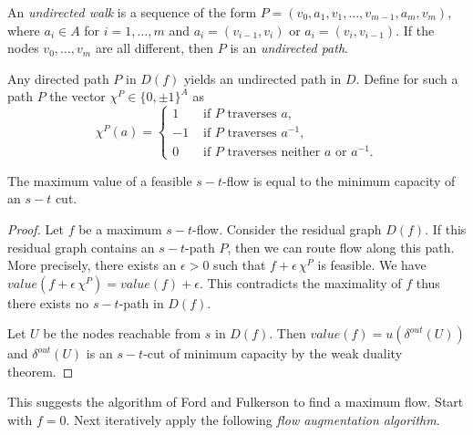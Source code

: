 \begin{definition}
\label{f:def:7}
  An \emph{undirected walk} is a  sequence of the form
  $P=(v_0,a_1,v_1,\ldots,v_{m-1},a_m,v_m)$, where  $a_i \in A$ for
  $i=1,\ldots,m$ and $a_i = (v_{i-1},v_i)$ or $a_i = (v_{i},v_{i-1})$. If
  the nodes $v_0,\ldots,v_m$ are all 
  different, then $P$ is an \emph{undirected path}. 
\end{definition}


Any directed path $P$ in $D(f)$ yields an undirected path  in
$D$. Define for such a path $P$ the vector $\chi^P \in \{0,\pm1\}^A$ as
\begin{equation}
  \label{f:eq:29}
  \chi^P(a) = 
  \begin{cases}
    1 & \mbox{ if $P$ traverses $a$},\\
    -1&  \mbox{ if $P$ traverses $a^{-1}$},\\
    0 & \mbox{ if $P$ traverses neither $a$ or $a^{-1}$}. 
  \end{cases}
\end{equation}


\begin{theorem}
  \label{f:thr:8}
  The maximum value of a feasible $s-t$-flow is equal to the minimum
  capacity of an $s-t$ cut.
\end{theorem}

\begin{proof}
  Let $f$ be a maximum $s-t$-flow. Consider the residual graph
  $D(f)$. If this residual graph contains an 
  $s-t$-path $P$, then we can route flow along this path. More
  precisely, there exists an $\epsilon>0$ such that $f + \epsilon \, \chi^P$ is feasible.
  We have $value(f + \epsilon \, \chi^P) = value(f) + \epsilon $. This contradicts the
  maximality of $f$ thus there exists no $s-t$-path in $D(f)$. 
  
  Let $U$ be the nodes reachable from $s$ in $D(f)$. Then 
  $value(f)=u(\delta^{out}(U))$ and $\delta^{out}(U)$ is an
  $s-t$-cut of minimum capacity by the weak duality theorem.
\end{proof}
 


This suggests the algorithm of Ford and Fulkerson to find a maximum
flow. Start with $f = 0$. Next iteratively apply the following
\emph{flow augmentation algorithm}. 


